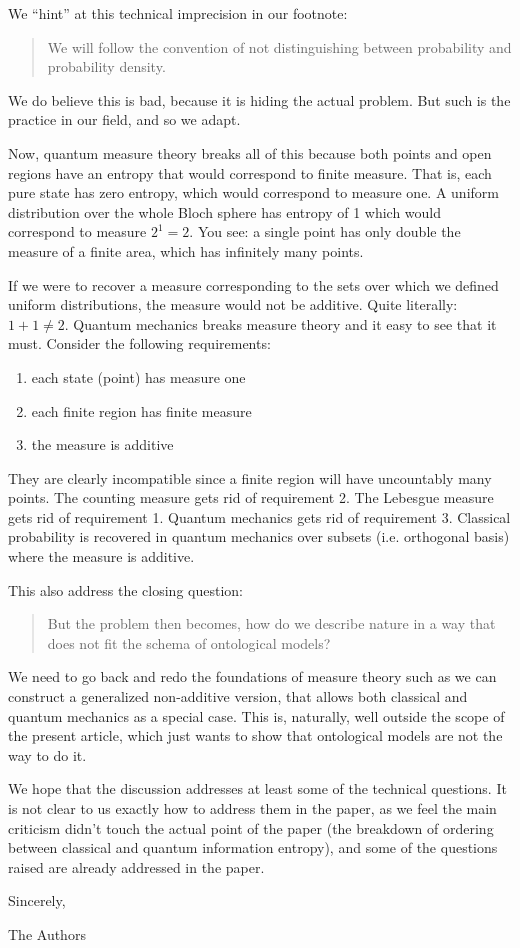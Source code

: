 \documentclass[11pt]{article}
\begin{document}
We ``hint'' at this technical imprecision in our footnote:
\begin{quote}
	We will follow the convention of not distinguishing between probability and probability density.
\end{quote}
We do believe this is bad, because it is hiding the actual problem. But such is the practice in our field, and so we adapt.

Now, quantum measure theory breaks all of this because both points and open regions have an entropy that would correspond to finite measure. That is, each pure state has zero entropy, which would correspond to measure one. A uniform distribution over the whole Bloch sphere has entropy of 1 which would correspond to measure $2^1 = 2$. You see: a single point has only double the measure of a finite area, which has infinitely many points.

If we were to recover a measure corresponding to the sets over which we defined uniform distributions, the measure would not be additive. Quite literally: $1+1\neq 2$. Quantum mechanics breaks measure theory and it easy to see that it must. Consider the following requirements:
\begin{enumerate}
	\item each state (point) has measure one
	\item each finite region has finite measure
	\item the measure is additive
\end{enumerate}
They are clearly incompatible since a finite region will have uncountably many points. The counting measure gets rid of requirement 2. The Lebesgue measure gets rid of requirement 1. Quantum mechanics gets rid of requirement 3. Classical probability is recovered in quantum mechanics over subsets (i.e. orthogonal basis) where the measure is additive.

This also address the closing question:
\begin{quote}
But the problem then becomes,
how do we describe nature in a way that does not fit the schema of ontological
models?	
\end{quote}
We need to go back and redo the foundations of measure theory such as we can construct a generalized non-additive version, that allows both classical and quantum mechanics as a special case. This is, naturally, well outside the scope of the present article, which just wants to show that ontological models are not the way to do it.

We hope that the discussion addresses at least some of the technical questions. It is not clear to us exactly how to address them in the paper, as we feel the main criticism didn't touch the actual point of the paper (the breakdown of ordering between classical and quantum information entropy), and some of the questions raised are already addressed in the paper.


Sincerely,

The Authors
\end{document}
